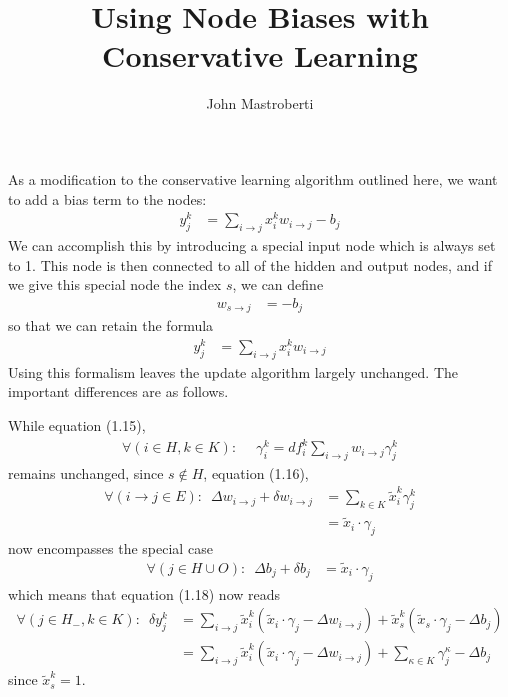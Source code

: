 \documentclass[12pt]{article}
\renewcommand{\ij}{i \rightarrow j}
\begin{document}
\title{Using Node Biases with Conservative Learning}
\author{John Mastroberti}
 
\maketitle

As a modification to the conservative learning algorithm outlined here\cite{cl_update}, we want to add a bias term to the nodes:
\begin{align}
y_j^k & = \sum_{i \rightarrow j} x_i^k w_{i \rightarrow j} - b_j
\end{align}
We can accomplish this by introducing a special input node which is always set to 1.
This node is then connected to all of the hidden and output nodes, 
and if we give this special node the index $s$, we can define
\begin{align}
w_{s \rightarrow j} & = -b_j
\end{align}
so that we can retain the formula 
\begin{align}
y_j^k & = \sum_{i \rightarrow j} x_i^k w_{i \rightarrow j}
\end{align}
Using this formalism leaves the update algorithm largely unchanged.
The important differences are as follows.

While equation (1.15),
\begin{align}
\forall (i \in H, k \in K): & \,\,\, \gamma_i^k = df_i^k \sum_{i \rightarrow j} w_{i \rightarrow j} \gamma_j^k
\end{align}
remains unchanged, since $s \not\in H$, equation (1.16),
\begin{align}
\forall (\ij \in E): \,\,\, \Delta w_{\ij} + \delta w_{\ij}
& = \sum_{k \in K} \tilde{x}_i^k \gamma_{j}^k \\
& = \tilde{x}_i \cdot \gamma_j
\end{align}
now encompasses the special case
\begin{align}
\forall (j \in H \cup O): \,\,\, \Delta b_j + \delta b_j 
& = \tilde{x}_i \cdot \gamma_j
\end{align}
which means that equation (1.18) now reads
\begin{align}
\forall (j \in H_-, k \in K): \,\,\, \delta y_j^k
& = \sum_{\ij} \tilde{x}_i^k (\tilde{x}_i \cdot \gamma_j - \Delta w_{\ij})
+ \tilde{x}_s^k (\tilde{x}_s \cdot \gamma_j - \Delta b_j) \\
& = \sum_{\ij} \tilde{x}_i^k (\tilde{x}_i \cdot \gamma_j - \Delta w_{\ij})
+ \sum_{\kappa \in K} \gamma_j^\kappa - \Delta b_j
\end{align}
since $\tilde{x}_s^k = 1$.





{}

\end{document}
